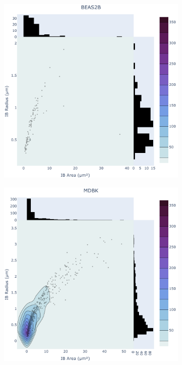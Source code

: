 \begin{figure}
    \medskip
    \begin{subfigure}{0.495\textwidth}
        \caption{}
        \includegraphics[width=\textwidth]{08. Chapter 3/Figs/01. Localisation introduction/04. heatmap_beas2b.pdf} 
    \end{subfigure}
    \hfill
    \begin{subfigure}{0.495\textwidth}
        \caption{}
        \includegraphics[width=\textwidth]{08. Chapter 3/Figs/01. Localisation introduction/05. heatmap_mdbk.pdf} 

\end{subfigure}
\end{figure}
